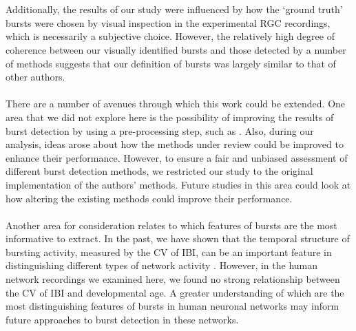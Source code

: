 \documentclass[12pt, titlepage]{article}
\begin{document}
\\ \\Additionally, the results of our study were influenced by how the `ground truth' bursts were chosen by visual inspection in the experimental RGC recordings, which is necessarily a subjective choice. However, the relatively high degree of coherence between our visually identified bursts and those detected by a number of methods suggests that our definition of bursts was largely similar to that of other authors.
\\ \\There are a number of avenues through which this work could be extended. One area that we did not explore here is the possibility of improving the results of burst detection by using a pre-processing step, such as \cite{Martens2014}. Also, during our analysis, ideas arose about how the methods under review could be improved to enhance their performance. However, to ensure a fair and unbiased assessment of different burst detection methods, we restricted our study to the original implementation of the authors' methods. Future studies in this area could look at how altering the existing methods could improve their performance. 
\\ \\ Another area for consideration relates to which features of bursts are the most informative to extract. In the past, we have shown that the temporal structure of bursting activity, measured by the CV of IBI, can be an important feature in distinguishing different types of network activity \cite{Charlesworth2015}. However, in the human network recordings we examined here, we found no strong relationship between the CV of IBI and developmental age. A greater understanding of which are the most distinguishing features of bursts in human neuronal networks may inform future approaches to burst detection in these networks. 
\pagebreak \\
\end{document}

